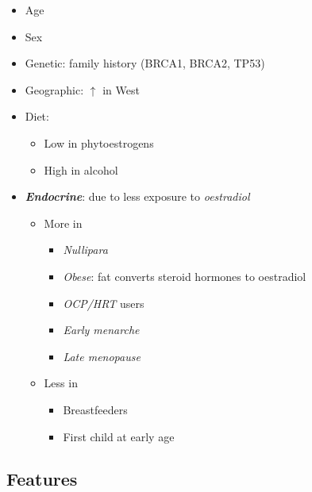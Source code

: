 \documentclass[
  14pt,
]{extarticle}
\providecommand{\tightlist}{%
  \setlength{\itemsep}{0pt}\setlength{\parskip}{0pt}}
\begin{document}
\begin{itemize}
\tightlist
\item
  Age
\item
  Sex
\item
  Genetic: family history (BRCA1, BRCA2, TP53)
\item
  Geographic: \(\uparrow\) in West
\item
  Diet:

  \begin{itemize}
  \tightlist
  \item
    Low in phytoestrogens
  \item
    High in alcohol
  \end{itemize}
\item
  \textbf{\emph{Endocrine}}: due to less exposure to \emph{oestradiol}

  \begin{itemize}
  \tightlist
  \item
    More in

    \begin{itemize}
    \tightlist
    \item
      \emph{Nullipara}
    \item
      \emph{Obese}: fat converts steroid hormones to oestradiol
    \item
      \emph{OCP/HRT} users
    \item
      \emph{Early menarche}
    \item
      \emph{Late menopause}
    \end{itemize}
  \item
    Less in

    \begin{itemize}
    \tightlist
    \item
      Breastfeeders
    \item
      First child at early age
    \end{itemize}
  \end{itemize}
\end{itemize}

\hypertarget{features-1}{%
\subsection{Features}\label{features-1}}
\end{document}
